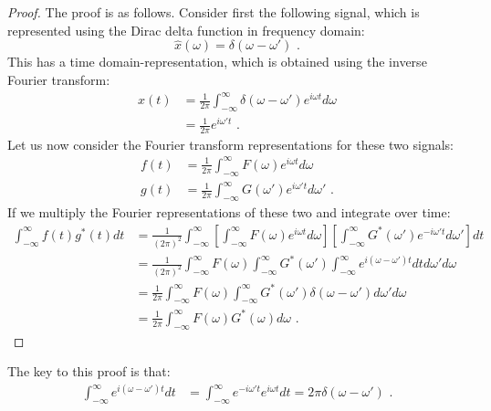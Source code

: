 \begin{proof}
    The proof is as follows. Consider first the following signal, which is represented 
    using the Dirac delta function in frequency domain:
    \begin{equation}
        \hat{x}(\omega) = \delta(\omega-\omega')\,\,.
    \end{equation}
    This has a time domain-representation, which is obtained using the inverse Fourier transform:
    \begin{align}
        x(t) & = \frac{1}{2\pi} \int_{-\infty}^{\infty} \delta(\omega-\omega')e^{i\omega t}d\omega \\
             & = \frac{1}{2\pi} e^{i\omega' t}\,\,.
    \end{align}
    Let us now consider the Fourier transform representations for these two signals:
    \begin{align}
        f(t) & = \frac{1}{2\pi} \int_{-\infty}^{\infty} F(\omega) e^{i\omega t}d\omega         \\
        g(t) & = \frac{1}{2\pi} \int_{-\infty}^{\infty} G(\omega') e^{i\omega' t}d\omega'\,\,.
    \end{align}
    If we multiply the Fourier representations of these two and integrate over time:
    \begin{align}
        \int_{-\infty}^{\infty} f(t)g^*(t)dt & = \frac{1}{(2\pi)^2} \int_{-\infty}^{\infty}  \left[\int_{-\infty}^{\infty} F(\omega) e^{i\omega t}d\omega \right] \left[ \int_{-\infty}^{\infty} G^*(\omega') e^{-i\omega' t}d\omega' \right]dt \\
                                             & = \frac{1}{(2\pi)^2} \int_{-\infty}^{\infty} F(\omega) \int_{-\infty}^{\infty} G^*(\omega') \int_{-\infty}^{\infty} e^{i(\omega-\omega')t}dt d\omega' d\omega                                    \\
                                             & =\frac{1}{2\pi} \int_{-\infty}^{\infty} F(\omega) \int_{-\infty}^{\infty} G^*(\omega') \delta(\omega-\omega') d\omega' d\omega                                                                   \\
                                             & =\frac{1}{2\pi} \int_{-\infty}^{\infty} F(\omega) G^*(\omega)  d\omega \,\,.
    \end{align}
\end{proof}
The key to this proof is that:
\begin{align}
    \int_{-\infty}^{\infty} e^{i(\omega-\omega')t}dt & = \int_{-\infty}^{\infty} e^{-i\omega' t} e^{i\omega t} dt = 2\pi \delta(\omega - \omega')\,\,.
\end{align}


